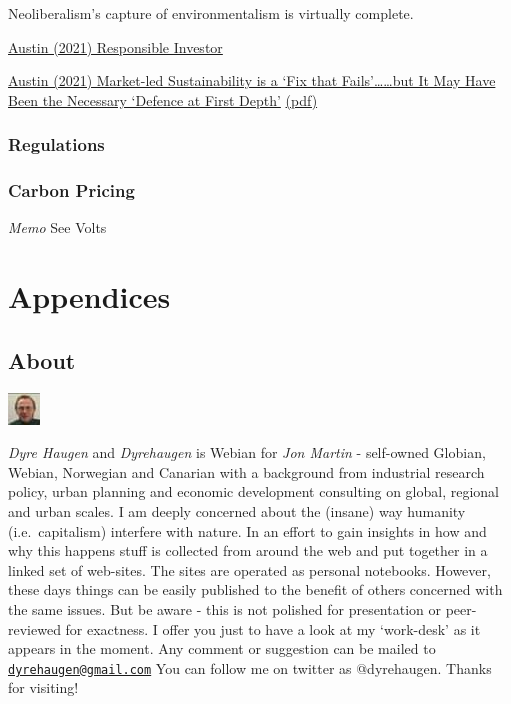 \documentclass[
]{book}
\begin{document}
Neoliberalism's capture of environmentalism is virtually complete.

\href{https://www.responsible-investor.com/articles/market-led-sustainability-is-a-fix-that-fails}{Austin (2021) Responsible Investor}

\href{https://bothbrainsrequired.com/2021/10/25/fix-that-fails/}{Austin (2021) Market-led Sustainability is a `Fix that Fails'\ldots\ldots but It May Have Been the Necessary `Defence at First Depth'}
\href{pdf/Austin_2021_Market_Led_Sustainability_Fix_Fails.pdf}{(pdf)}

\hypertarget{regulations}{%
\section{Regulations}\label{regulations}}

\hypertarget{carbon-pricing}{%
\section{Carbon Pricing}\label{carbon-pricing}}

\emph{Memo} See Volts

\hypertarget{part-appendices}{%
\part{Appendices}\label{part-appendices}}

\hypertarget{appendix-appendices}{%
\appendix}


\hypertarget{about}{%
\chapter{About}\label{about}}

\includegraphics{fig/me.jpg}

\emph{Dyre Haugen} and \emph{Dyrehaugen} is Webian for \emph{Jon Martin} -
self-owned Globian, Webian, Norwegian and Canarian with
a background from industrial research policy, urban planning and
economic development consulting on global, regional and urban scales.
I am deeply concerned about the (insane) way
humanity (i.e.~capitalism) interfere with nature.
In an effort to gain insights in how and why this happens
stuff is collected from around the web and put together
in a linked set of web-sites.
The sites are operated as personal notebooks.
However, these days things can be easily published to the
benefit of others concerned with the same issues.
But be aware - this is not polished for presentation or
peer-reviewed for exactness.
I offer you just to have a look at my `work-desk' as it appears in the moment.
Any comment or suggestion can be mailed to \href{mailto:dyrehaugen@gmail.com}{\nolinkurl{dyrehaugen@gmail.com}}
You can follow me on twitter as @dyrehaugen.
Thanks for visiting!
\end{document}
